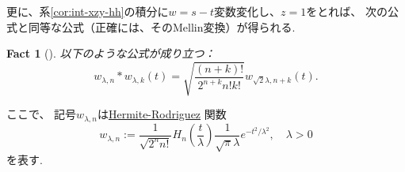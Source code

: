 \documentclass[pdf,notes]{beamer}
\newtheorem*{fact*}{Fact}
\begin{document}
\begin{frame}
	更に、系\ref{cor:int-xzy-hh}の積分に$w=s-t$変数変化し、$z=1$をとれば、
	次の公式と同等な公式（正確には、そのMellin変換）が得られる.
	\begin{fact*}[{\cite[(18)]{conte1994hermite}}]
		以下のような公式が成り立つ：
		\begin{equation}
			w_{\lambda,n}\ast w_{\lambda,k}(t)=\sqrt{\frac{(n+k)!}{2^{n+k}n!k!}}w_{\sqrt{2}\lambda,n+k}(t).
			\label{eqn:mellin-hh}
		\end{equation}
	\end{fact*}
	ここで、
	記号$w_{\lambda,n}$は\underline{Hermite-Rodriguez} 関数 \cite{yusoff2007application}
	\begin{equation*}
		w_{\lambda,n}:=\frac{1}{\sqrt{2^nn!}}H_n\left( \frac{t}{\lambda} \right)\frac{1}{\sqrt{\pi}\lambda}e^{-t^2/\lambda^2},\quad \lambda>0
	\end{equation*}
	を表す.
\end{frame}
\end{document}
